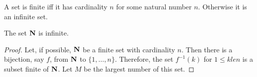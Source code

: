 \begin{defn}\label{c2s6d3}
A set is finite iff it has cardinality $n$ for some natural number $n$. 
Otherwise it is an infinite set.
\end{defn}

\begin{thm}\label{c2s6t1}
The set $\mathbf{N}$ is infinite.
\end{thm}
\begin{proof}
Let, if possible, $\mathbf{N}$ be a finite set with cardinality $n$. Then there is a 
bijection, say $f$, from $\mathbf{N}$ to $\{1, \ldots, n\}$. Therefore, the set 
$f^{-1}(k)$ for $1 \le k le n$ is a subset finite of $\mathbf{N}$. Let $M$ be the
largest number of this set.
\end{proof}
